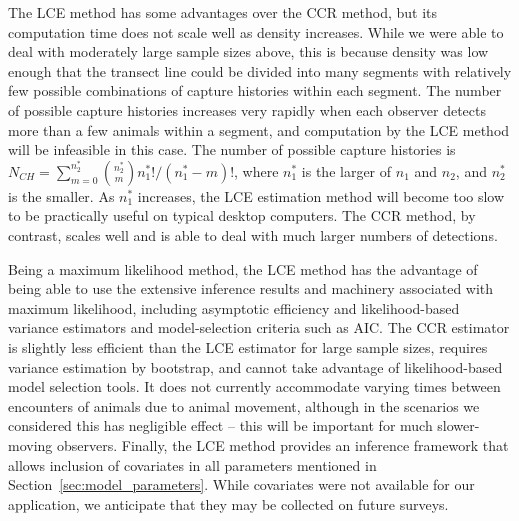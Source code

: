 \documentclass[useAMS, usenatbib, referee]{biom}\usepackage[]{graphicx}\usepackage[]{color}
\begin{document}
The LCE method has some advantages over the CCR method, but its computation time does not scale well as density increases.
While we were able to deal with moderately large sample sizes above, this is because density was low enough that the transect line could be divided into many segments with relatively few possible combinations of capture histories within each segment. The number of possible capture histories increases very rapidly when each observer detects more than a few animals within a segment, and computation by the LCE method will be infeasible in this case. The number of possible capture histories is $N_{CH}=\sum_{m=0}^{n_2^*}{n_2^*\choose m} n_1^*!/(n_1^*-m)!$, where $n_1^*$ is the larger of $n_1$ and $n_2$, and $n_2^*$ is the smaller. %
As $n_1^*$ increases, the LCE estimation method will become too slow to be practically useful on typical desktop computers. The CCR method, by contrast, scales well and is able to deal with much larger numbers of detections.


Being a maximum likelihood method, the LCE method has the advantage of being able to use the extensive inference results and machinery associated with maximum likelihood, including asymptotic efficiency and likelihood-based variance estimators and model-selection criteria such as AIC. The CCR estimator is slightly less efficient than the LCE estimator for large sample sizes, requires variance estimation by bootstrap, and cannot take advantage of likelihood-based model selection tools. It does not currently accommodate varying times between encounters of animals due to animal movement, although in the scenarios we considered this has negligible effect -- this will be important for much slower-moving observers. Finally, the LCE method provides an inference framework that allows inclusion of covariates in all parameters mentioned in Section~\ref{sec:model_parameters}. While covariates were not available for our application, we anticipate that they may be collected on future surveys. %
\end{document}
